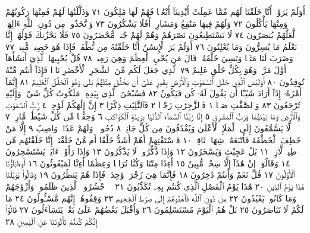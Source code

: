 أَوَلَمْ يَرَوْا۟ أَنَّا خَلَقْنَا لَهُم مِّمَّا عَمِلَتْ أَيْدِينَآ أَنْعَٰمࣰا
فَهُمْ لَهَا مَٰلِكُونَ ٧١ وَذَلَّلْنَٰهَا لَهُمْ فَمِنْهَا رَكُوبُهُمْ
وَمِنْهَا يَأْكُلُونَ ٧٢ وَلَهُمْ فِيهَا مَنَٰفِعُ وَمَشَارِبُۚ
أَفَلَا يَشْكُرُونَ ٧٣ وَٱتَّخَذُوا۟ مِن دُونِ ٱللَّهِ ءَالِهَةࣰ
لَّعَلَّهُمْ يُنصَرُونَ ٧٤ لَا يَسْتَطِيعُونَ نَصْرَهُمْ وَهُمْ لَهُمْ
جُندࣱ مُّحْضَرُونَ ٧٥ فَلَا يَحْزُنكَ قَوْلُهُمْۘ إِنَّا نَعْلَمُ
مَا يُسِرُّونَ وَمَا يُعْلِنُونَ ٧٦ أَوَلَمْ يَرَ ٱلْإِنسَٰنُ أَنَّا خَلَقْنَٰهُ
مِن نُّطْفَةࣲ فَإِذَا هُوَ خَصِيمࣱ مُّبِينࣱ ٧٧ وَضَرَبَ لَنَا
مَثَلࣰا وَنَسِيَ خَلْقَهُۥۖ قَالَ مَن يُحْيِ ٱلْعِظَٰمَ وَهِيَ رَمِيمࣱ ٧٨
قُلْ يُحْيِيهَا ٱلَّذِيٓ أَنشَأَهَآ أَوَّلَ مَرَّةࣲۖ وَهُوَ بِكُلِّ خَلْقٍ عَلِيمٌ ٧٩
ٱلَّذِي جَعَلَ لَكُم مِّنَ ٱلشَّجَرِ ٱلْأَخْضَرِ نَارࣰا فَإِذَآ أَنتُم
مِّنْهُ تُوقِدُونَ ٨٠ أَوَلَيْسَ ٱلَّذِي خَلَقَ ٱلسَّمَٰوَٰتِ وَٱلْأَرْضَ
بِقَٰدِرٍ عَلَىٰٓ أَن يَخْلُقَ مِثْلَهُمۚ بَلَىٰ وَهُوَ ٱلْخَلَّٰقُ ٱلْعَلِيمُ ٨١
إِنَّمَآ أَمْرُهُۥٓ إِذَآ أَرَادَ شَيْـًٔا أَن يَقُولَ لَهُۥ كُن فَيَكُونُ ٨٢
فَسُبْحَٰنَ ٱلَّذِي بِيَدِهِۦ مَلَكُوتُ كُلِّ شَيْءࣲ وَإِلَيْهِ تُرْجَعُونَ ٨٣
وَٱلصَّٰٓفَّٰتِ صَفࣰّا ١ فَٱلزَّٰجِرَٰتِ زَجْرࣰا ٢ فَٱلتَّٰلِيَٰتِ ذِكْرًا ٣ إِنَّ إِلَٰهَكُمْ
لَوَٰحِدࣱ ٤ رَّبُّ ٱلسَّمَٰوَٰتِ وَٱلْأَرْضِ وَمَا بَيْنَهُمَا وَرَبُّ ٱلْمَشَٰرِقِ ٥ إِنَّا زَيَّنَّا
ٱلسَّمَآءَ ٱلدُّنْيَا بِزِينَةٍ ٱلْكَوَاكِبِ ٦ وَحِفْظࣰا مِّن كُلِّ شَيْطَٰنࣲ مَّارِدࣲ ٧
لَّا يَسَّمَّعُونَ إِلَى ٱلْمَلَإِ ٱلْأَعْلَىٰ وَيُقْذَفُونَ مِن كُلِّ جَانِبࣲ ٨ دُحُورࣰاۖ وَلَهُمْ
عَذَابࣱ وَاصِبٌ ٩ إِلَّا مَنْ خَطِفَ ٱلْخَطْفَةَ فَأَتْبَعَهُۥ شِهَابࣱ ثَاقِبࣱ ١٠
فَٱسْتَفْتِهِمْ أَهُمْ أَشَدُّ خَلْقًا أَم مَّنْ خَلَقْنَآۚ إِنَّا خَلَقْنَٰهُم مِّن طِينࣲ لَّازِبِۭ ١١
بَلْ عَجِبْتَ وَيَسْخَرُونَ ١٢ وَإِذَا ذُكِّرُوا۟ لَا يَذْكُرُونَ ١٣ وَإِذَا رَأَوْا۟ ءَايَةࣰ
يَسْتَسْخِرُونَ ١٤ وَقَالُوٓا۟ إِنْ هَٰذَآ إِلَّا سِحْرࣱ مُّبِينٌ ١٥ أَءِذَا مِتْنَا
وَكُنَّا تُرَابࣰا وَعِظَٰمًا أَءِنَّا لَمَبْعُوثُونَ ١٦ أَوَءَابَآؤُنَا ٱلْأَوَّلُونَ ١٧ قُلْ نَعَمْ
وَأَنتُمْ دَٰخِرُونَ ١٨ فَإِنَّمَا هِيَ زَجْرَةࣱ وَٰحِدَةࣱ فَإِذَا هُمْ يَنظُرُونَ ١٩ وَقَالُوا۟
يَٰوَيْلَنَا هَٰذَا يَوْمُ ٱلدِّينِ ٢٠ هَٰذَا يَوْمُ ٱلْفَصْلِ ٱلَّذِي كُنتُم بِهِۦ تُكَذِّبُونَ ٢١
۞ ٱحْشُرُوا۟ ٱلَّذِينَ ظَلَمُوا۟ وَأَزْوَٰجَهُمْ وَمَا كَانُوا۟ يَعْبُدُونَ ٢٢ مِن دُونِ
ٱللَّهِ فَٱهْدُوهُمْ إِلَىٰ صِرَٰطِ ٱلْجَحِيمِ ٢٣ وَقِفُوهُمْۖ إِنَّهُم مَّسْـُٔولُونَ ٢٤
مَا لَكُمْ لَا تَنَاصَرُونَ ٢٥ بَلْ هُمُ ٱلْيَوْمَ مُسْتَسْلِمُونَ ٢٦ وَأَقْبَلَ بَعْضُهُمْ
عَلَىٰ بَعْضࣲ يَتَسَآءَلُونَ ٢٧ قَالُوٓا۟ إِنَّكُمْ كُنتُمْ تَأْتُونَنَا عَنِ ٱلْيَمِينِ ٢٨
